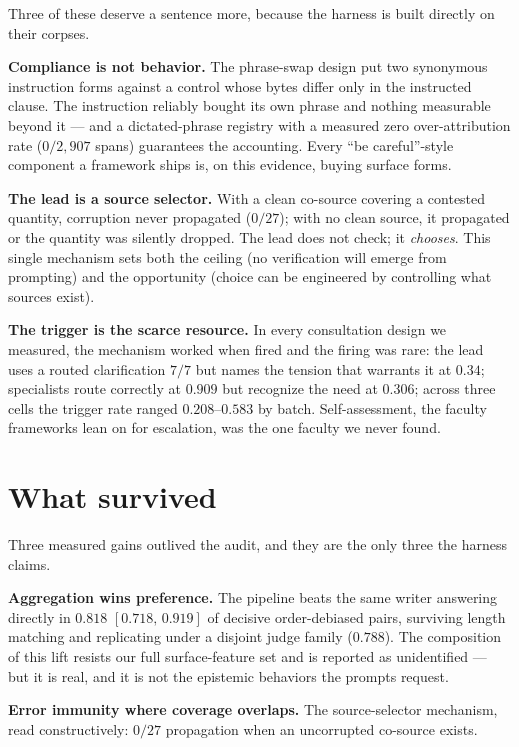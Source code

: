 \documentclass[11pt]{article}
\newcommand{\ci}[2]{\ensuremath{[#1,\,#2]}}
\begin{document}
Three of these deserve a sentence more, because the harness is built
directly on their corpses.

\textbf{Compliance is not behavior.} The phrase-swap design put two
synonymous instruction forms against a control whose bytes differ only
in the instructed clause. The instruction reliably bought its own
phrase and nothing measurable beyond it --- and a dictated-phrase
registry with a measured zero over-attribution rate ($0/2{,}907$
spans) guarantees the accounting. Every ``be careful''-style component
a framework ships is, on this evidence, buying surface forms.

\textbf{The lead is a source selector.} With a clean co-source covering
a contested quantity, corruption never propagated ($0/27$); with no
clean source, it propagated or the quantity was silently dropped. The
lead does not check; it \emph{chooses}. This single mechanism sets both
the ceiling (no verification will emerge from prompting) and the
opportunity (choice can be engineered by controlling what sources
exist).

\textbf{The trigger is the scarce resource.} In every consultation
design we measured, the mechanism worked when fired and the firing was
rare: the lead uses a routed clarification $7/7$ but names the tension
that warrants it at $0.34$; specialists route correctly at $0.909$ but
recognize the need at $0.306$; across three cells the trigger rate
ranged $0.208$--$0.583$ by batch. Self-assessment, the faculty
frameworks lean on for escalation, was the one faculty we never found.

\section{What survived}
\label{sec:survivors}

Three measured gains outlived the audit, and they are the only three
the harness claims.

\textbf{Aggregation wins preference.} The pipeline beats the same
writer answering directly in $0.818$ \ci{0.718}{0.919} of decisive
order-debiased pairs, surviving length matching and replicating under a
disjoint judge family ($0.788$). The composition of this lift resists
our full surface-feature set and is reported as unidentified --- but it
is real, and it is not the epistemic behaviors the prompts request.

\textbf{Error immunity where coverage overlaps.} The source-selector
mechanism, read constructively: $0/27$ propagation when an uncorrupted
co-source exists.
\end{document}
